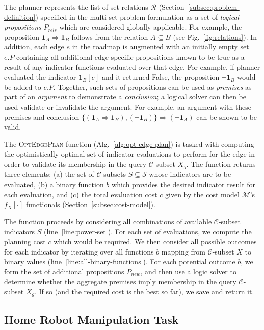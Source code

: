 \documentclass{report}
\begin{document}
The planner represents the list of set relations $\mathcal{R}$
(Section~\ref{subsec:problem-definition})
specified in the multi-set problem formulation
as a set of \emph{logical propositions} $P_{rels}$
which are considered globally applicable.
For example,
the proposition $\mathbf{1}_A \Rightarrow \mathbf{1}_B$
follows from the relation $A \subseteq B$
(see Fig.~\ref{fig:relations}).
In addition,
each edge $e$ in the roadmap is augmented with an initially empty
set $e.P$ containing all additional edge-specific propositions
known to be true as a result of any indicator functions evaluated
over that edge.
For example,
if planner evaluated the indicator $\mathbf{1}_B[e]$
and it returned False,
the proposition $\lnot\mathbf{1}_B$ would be added to $e.P$.
Together, such sets of propositions can be used as \emph{premises}
as part of an \emph{argument} to demonstrate a \emph{conclusion};
a logical solver can then be used validate or invalidate the argument.
For example, an argument with these premises and conclusion
$\{ (\mathbf{1}_A \Rightarrow \mathbf{1}_B), (\lnot\mathbf{1}_B) \}
\Rightarrow (\lnot\mathbf{1}_A)$
can be shown to be valid.

The \textsc{OptEdgePlan} function (Alg.~\ref{alg:opt-edge-plan})
is tasked with computing
the optimistically optimal set of indicator evaluations to perform
for the edge in order to validate its membership in the query
$\mathcal{C}$-subset $X_g$.
The function returns three elements:
(a) the set of $\mathcal{C}$-subsets $S \subseteq \mathcal{S}$
whose indicators are to be evaluated,
(b) a binary function $b$
which provides the desired indicator result for each evaluation,
and (c) the total evaluation cost $c$
given by the cost model $\mathcal{M}$'s $f_X[\cdot]$ functionals
(Section~\ref{subsec:cost-model}).

The function proceeds by considering all combinations of
available $\mathcal{C}$-subset indicators $S$ (line~\ref{line:power-set}).
For each set of evaluations,
we compute the planning cost $c$ which would be required.
We then consider all possible outcomes for each indicator
by iterating over all functions $b$ mapping
from $\mathcal{C}$-subset $X$ to binary values
(line~\ref{line:all-binary-functions}).
For each potential outcome $b$,
we form the set of additional propositions $P_{new}$,
and then use a logic solver to determine whether the aggregate
premises imply membership in the query $\mathcal{C}$-subset $X_g$.
If so (and the required cost is the best so far),
we save and return it.

\subsection{Home Robot Manipulation Task}
\label{subsec:herb-experiment}
\end{document}
